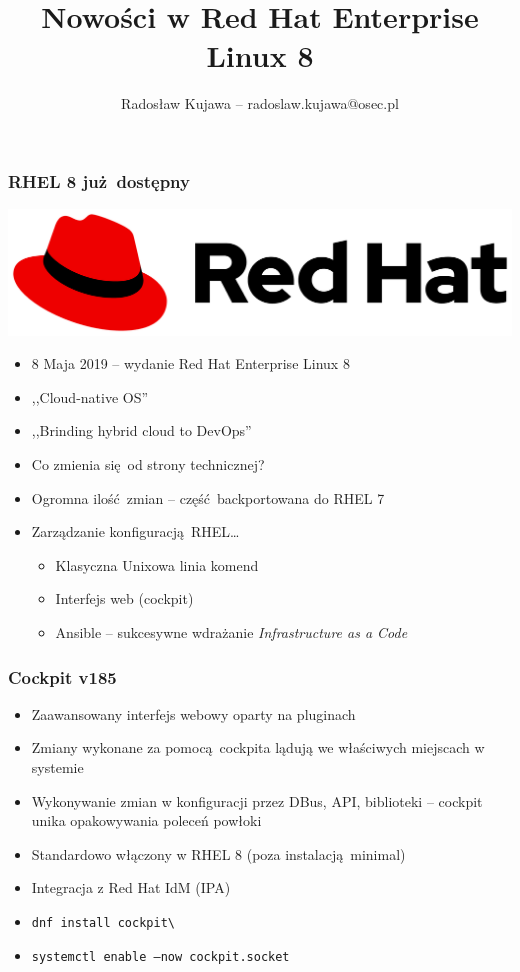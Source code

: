 \documentclass[dvipsnames,table]{beamer}
\title{Nowości w Red Hat Enterprise Linux 8}
\author{Radosław Kujawa -- radoslaw.kujawa@osec.pl}
\institute{OSEC}
\begin{document}
\begin{frame}
	\titlepage
\end{frame}

\begin{frame}
\frametitle{RHEL 8 już dostępny}
\begin{center}
\includegraphics[scale=0.1]{img-rhlogo.png}
\end{center}
\begin{itemize}
	\item 8 Maja 2019 -- wydanie Red Hat Enterprise Linux 8
	\item ,,Cloud-native OS''
	\item ,,Brinding hybrid cloud to DevOps''
	\item Co zmienia się od strony technicznej?
	\item Ogromna ilość zmian -- część backportowana do RHEL 7
	\item Zarządzanie konfiguracją RHEL\ldots
	\begin{itemize}
		\item Klasyczna Unixowa linia komend
		\item Interfejs web (cockpit)
		\item Ansible -- sukcesywne wdrażanie {\em Infrastructure as a Code}
	\end{itemize}
\end{itemize}
\begin{center}
\end{center}
\end{frame}

\begin{frame}
\frametitle{Cockpit v185}
\begin{itemize}
	\item Zaawansowany interfejs webowy oparty na pluginach
	\item Zmiany wykonane za pomocą cockpita lądują we właściwych miejscach w systemie
	\item Wykonywanie zmian w konfiguracji przez DBus, API, biblioteki -- cockpit unika opakowywania poleceń powłoki
	\item Standardowo włączony w RHEL 8 (poza instalacją minimal)
	\item Integracja z Red Hat IdM (IPA)
	\item {\tt dnf install cockpit\textbackslash* }
	\item {\tt systemctl enable --now cockpit.socket}
\end{itemize}
\begin{center}
\end{center}
\end{frame}
\end{document}
